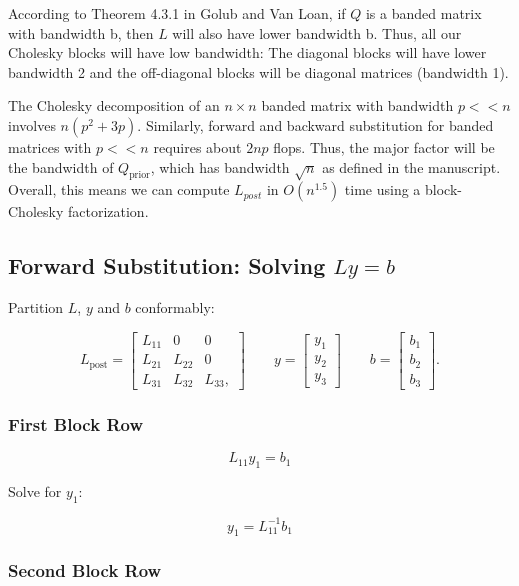 \documentclass[
  letterpaper,
  DIV=11,
  numbers=noendperiod]{scrartcl}
\begin{document}
According to Theorem 4.3.1 in Golub and Van Loan, if \(Q\) is a banded
matrix with bandwidth b, then \(L\) will also have lower bandwidth b.
Thus, all our Cholesky blocks will have low bandwidth: The diagonal
blocks will have lower bandwidth 2 and the off-diagonal blocks will be
diagonal matrices (bandwidth 1).

The Cholesky decomposition of an \(n \times n\) banded matrix with
bandwidth \(p << n\) involves \(n(p^2 + 3p)\). Similarly, forward and
backward substitution for banded matrices with \(p << n\) requires about
\(2np\) flops. Thus, the major factor will be the bandwidth of
\(Q_\text{prior}\), which has bandwidth \(\sqrt{n}\) as defined in the
manuscript. Overall, this means we can compute \(L_{post}\) in
\(O(n^{1.5})\) time using a block-Cholesky factorization.

\subsection{\texorpdfstring{Forward Substitution: Solving
\(Ly = b\)}{Forward Substitution: Solving Ly = b}}\label{forward-substitution-solving-ly-b}

Partition \(L\), \(y\) and \(b\) conformably:

\[
L_\text{post} = \begin{bmatrix}
L_{11} & 0 & 0 \\
L_{21} & L_{22} & 0 \\
L_{31} & L_{32} & L_{33},
\end{bmatrix} \qquad
y = \begin{bmatrix}
y_1 \\
y_2 \\
y_3
\end{bmatrix} \qquad
b = \begin{bmatrix}
b_1 \\
b_2 \\
b_3
\end{bmatrix}.
\]

\subsubsection{\texorpdfstring{\textbf{First Block
Row}}{First Block Row}}\label{first-block-row}

\[
L_{11} y_1 = b_1
\]

Solve for \(y_1\):

\[
y_1 = L_{11}^{-1}b_1
\]

\subsubsection{\texorpdfstring{\textbf{Second Block
Row}}{Second Block Row}}\label{second-block-row}
\end{document}
